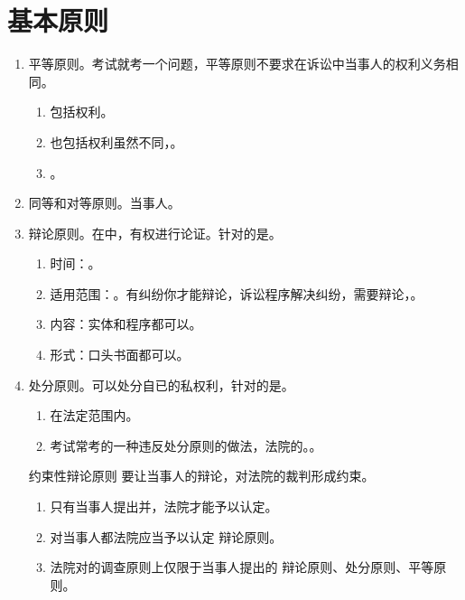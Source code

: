 \section{基本原则}
\begin{enumerate}
  \item 平等原则。考试就考一个问题，平等原则不要求在诉讼中当事人的权利义务相同。
        \begin{enumerate}
          \item 包括权利。
          \item 也包括权利虽然不同，。
          \item {}。
        \end{enumerate}
  \item 同等和对等原则。当事人。
  \item 辩论原则。在中，有权进行论证。针对的是。
        \begin{enumerate}
          \item 时间：。
          \item 适用范围：。有纠纷你才能辩论，诉讼程序解决纠纷，需要辩论，。
          \item 内容：实体和程序都可以。
          \item 形式：口头书面都可以。
        \end{enumerate}
  \item 处分原则。可以处分自已的私权利，针对的是。
        \begin{enumerate}
          \item 在法定范围内。
          \item 考试常考的一种违反处分原则的做法，法院的。。
        \end{enumerate}
        \begin{kk}{约束性辩论原则}
          要让当事人的辩论，对法院的裁判形成约束。
          \begin{enumerate}
            \item 只有当事人提出并，法院才能予以认定。
            \item 对当事人都法院应当予以认定 \yjt {} \yjt 辩论原则。
            \item 法院对的调查原则上仅限于当事人提出的 \yjt 辩论原则、处分原则、平等原则。
          \end{enumerate}

\end{kk}
\end{enumerate}
